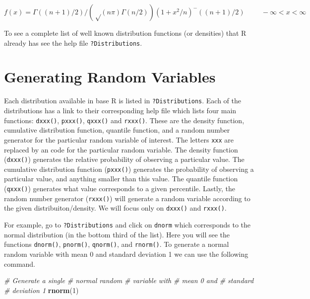 \documentclass[
]{book}
\newenvironment{Shaded}{\begin{snugshade}}{\end{snugshade}}
\newcommand{\CommentTok}[1]{\textcolor[rgb]{0.56,0.35,0.01}{\textit{#1}}}
\newcommand{\DecValTok}[1]{\textcolor[rgb]{0.00,0.00,0.81}{#1}}
\newcommand{\KeywordTok}[1]{\textcolor[rgb]{0.13,0.29,0.53}{\textbf{#1}}}
\newcommand{\NormalTok}[1]{#1}
\begin{document}
\[f(x) = Γ((n+1)/2) / (√(n π) Γ(n/2)) (1 + x^2/n)^-((n+1)/2)\hspace{1cm} -\infty <x < \infty\]

To see a complete list of well known distribution functions (or densities) that R already has see the help file \texttt{?Distributions}.

\hypertarget{generating-random-variables}{%
\section{Generating Random Variables}\label{generating-random-variables}}

Each distribution available in base R is listed in \texttt{?Distributions}. Each of the distributions has a link to their corresponding help file which lists four main functions: \texttt{dxxx()}, \texttt{pxxx()}, \texttt{qxxx()} and \texttt{rxxx()}. These are the density function, cumulative distribution function, quantile function, and a random number generator for the particular random variable of interest. The letters \texttt{xxx} are replaced by an code for the particular random variable. The density function (\texttt{dxxx()}) generates the relative probability of observing a particular value. The cumulative distribution function (\texttt{pxxx()}) generates the probability of observing a particular value, and anything smaller than this value. The quantile function (\texttt{qxxx()}) generates what value corresponds to a given percentile. Lastly, the random number generator (\texttt{rxxx()}) will generate a random variable according to the given distribuiton/density. We will focus only on \texttt{dxxx()} and \texttt{rxxx()}.

For example, go to \texttt{?Distributions} and click on \texttt{dnorm} which corresponds to the normal distribution (in the bottom third of the list). Here you will see the functions \texttt{dnorm()}, \texttt{pnorm()}, \texttt{qnorm()}, and \texttt{rnorm()}. To generate a normal random variable with mean 0 and standard deviation 1 we can use the following command.

\begin{Shaded}
\begin{Highlighting}[]
\CommentTok{# Generate a single}
\CommentTok{# normal random}
\CommentTok{# variable with}
\CommentTok{# mean 0 and}
\CommentTok{# standard}
\CommentTok{# deviation 1}
\KeywordTok{rnorm}\NormalTok{(}\DecValTok{1}\NormalTok{)}
\end{Highlighting}
\end{Shaded}
\end{document}

